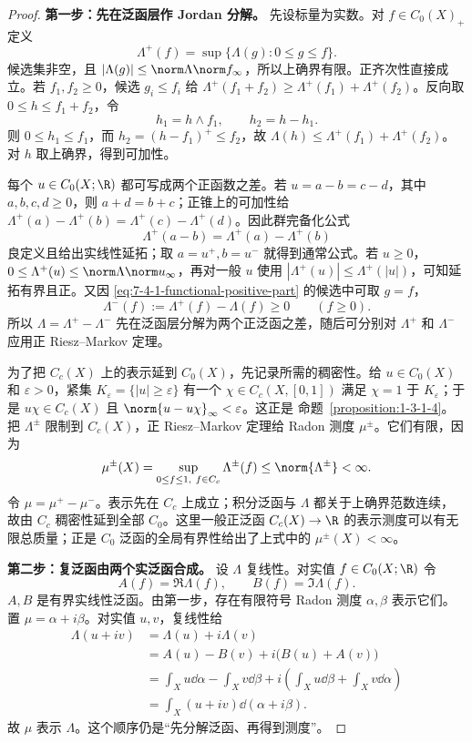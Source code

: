 \begin{proof}
\textbf{第一步：先在泛函层作 Jordan 分解。}
先设标量为实数。对 $f\in C_0(X)_+$ 定义
\begin{equation}\label{eq:7-4-1-functional-positive-part}
 \Lambda^+(f)=\sup\{\Lambda(g):0\le g\le f\}.
\end{equation}
候选集非空，且
$|\Lambda(g)|\le\norm\Lambda\norm f_\infty$，所以上确界有限。正齐次性直接成立。若
$f_1,f_2\ge0$，候选 $g_i\le f_i$ 给
$\Lambda^+(f_1+f_2)\ge\Lambda^+(f_1)+\Lambda^+(f_2)$。反向取
$0\le h\le f_1+f_2$，令
\[
 h_1=h\wedge f_1,\qquad h_2=h-h_1.
\]
则 $0\le h_1\le f_1$，而
$h_2=(h-f_1)^+\le f_2$，故
$\Lambda(h)\le\Lambda^+(f_1)+\Lambda^+(f_2)$。对 $h$ 取上确界，得到可加性。

每个 $u\in C_0(X;\R)$ 都可写成两个正函数之差。若
$u=a-b=c-d$，其中 $a,b,c,d\ge0$，则 $a+d=b+c$；正锥上的可加性给
$\Lambda^+(a)-\Lambda^+(b)=\Lambda^+(c)-\Lambda^+(d)$。因此群完备化公式
\[
 \Lambda^+(a-b)=\Lambda^+(a)-\Lambda^+(b)
\]
良定义且给出实线性延拓；取 $a=u^+,b=u^-$ 就得到通常公式。若 $u\ge0$，
$0\le\Lambda^+(u)\le\norm\Lambda\norm u_\infty$，再对一般 $u$ 使用
$|\Lambda^+(u)|\le\Lambda^+(|u|)$，可知延拓有界且正。又因
\eqref{eq:7-4-1-functional-positive-part} 的候选中可取 $g=f$，
\[
 \Lambda^-(f):=\Lambda^+(f)-\Lambda(f)\ge0\qquad(f\ge0).
\]
所以 $\Lambda=\Lambda^+-\Lambda^-$ 先在泛函层分解为两个正泛函之差，随后可分别对
$\Lambda^+$ 和 $\Lambda^-$ 应用正 Riesz--Markov 定理。

为了把 $C_c(X)$ 上的表示延到 $C_0(X)$，先记录所需的稠密性。给 $u\in C_0(X)$ 和 $\varepsilon>0$，紧集
$K_\varepsilon=\{|u|\ge\varepsilon\}$ 有一个 $\chi\in C_c(X,[0,1])$ 满足
$\chi=1$ 于 $K_\varepsilon$；于是
$u\chi\in C_c(X)$ 且 $\norm{u-u\chi}_\infty<\varepsilon$。这正是
命题~\ref{proposition:1-3-1-4}。把
$\Lambda^\pm$ 限制到 $C_c(X)$，正 Riesz--Markov 定理给 Radon 测度 $\mu^\pm$。它们有限，因为
\[
 \mu^\pm(X)
 =\sup_{0\le f\le1,\ f\in C_c}\Lambda^\pm(f)
 \le\norm{\Lambda^\pm}<\infty.
\]
令 $\mu=\mu^+-\mu^-$。表示先在 $C_c$ 上成立；积分泛函与 $\Lambda$ 都关于上确界范数连续，故由
$C_c$ 稠密性延到全部 $C_0$。这里一般正泛函 $C_c(X)\to\R$ 的表示测度可以有无限总质量；正是
$C_0$ 泛函的全局有界性给出了上式中的 $\mu^\pm(X)<\infty$。

\textbf{第二步：复泛函由两个实泛函合成。}
设 $\Lambda$ 复线性。对实值 $f\in C_0(X;\R)$ 令
\[
 A(f)=\Re\Lambda(f),\qquad B(f)=\Im\Lambda(f).
\]
$A,B$ 是有界实线性泛函。由第一步，存在有限符号 Radon 测度 $\alpha,\beta$ 表示它们。
置 $\mu=\alpha+i\beta$。对实值 $u,v$，复线性给
\begin{align*}
 \Lambda(u+iv)
 &=\Lambda(u)+i\Lambda(v)\\
 &=A(u)-B(v)+i\bigl(B(u)+A(v)\bigr)\\
 &=\int_Xu\dd\alpha-\int_Xv\dd\beta
   +i\left(\int_Xu\dd\beta+\int_Xv\dd\alpha\right)\\
 &=\int_X(u+iv)\dd(\alpha+i\beta).
\end{align*}
故 $\mu$ 表示 $\Lambda$。这个顺序仍是“先分解泛函、再得到测度”。


\end{proof}
